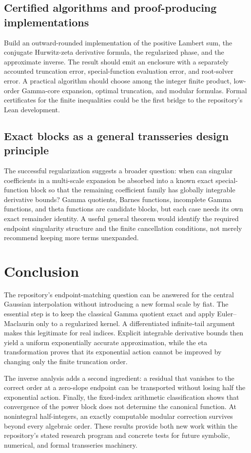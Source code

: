 \documentclass[11pt,a4paper]{article}
\numberwithin{equation}{section}
\theoremstyle{definition}
\begin{document}
\subsection{Certified algorithms and proof-producing implementations}
Build an outward-rounded implementation of the positive Lambert sum, the conjugate Hurwitz-zeta derivative formula, the regularized phase, and the approximate inverse. The result should emit an enclosure with a separately accounted truncation error, special-function evaluation error, and root-solver error. A practical algorithm should choose among the integer finite product, low-order Gamma-core expansion, optimal truncation, and modular formulas. Formal certificates for the finite inequalities could be the first bridge to the repository's Lean development.

\subsection{Exact blocks as a general transseries design principle}
The successful regularization suggests a broader question: when can singular coefficients in a multi-scale expansion be absorbed into a known exact special-function block so that the remaining coefficient family has globally integrable derivative bounds? Gamma quotients, Barnes functions, incomplete Gamma functions, and theta functions are candidate blocks, but each case needs its own exact remainder identity. A useful general theorem would identify the required endpoint singularity structure and the finite cancellation conditions, not merely recommend keeping more terms unexpanded.

\section{Conclusion}

The repository's endpoint-matching question can be answered for the central Gaussian interpolation without introducing a new formal scale by fiat. The essential step is to keep the classical Gamma quotient exact and apply Euler--Maclaurin only to a regularized kernel. A differentiated infinite-tail argument makes this legitimate for real indices. Explicit integrable derivative bounds then yield a uniform exponentially accurate approximation, while the eta transformation proves that its exponential action cannot be improved by changing only the finite truncation order.

The inverse analysis adds a second ingredient: a residual that vanishes to the correct order at a zero-slope endpoint can be transported without losing half the exponential action. Finally, the fixed-index arithmetic classification shows that convergence of the power block does not determine the canonical function. At nonintegral half-integers, an exactly computable modular correction survives beyond every algebraic order. These results provide both new work within the repository's stated research program and concrete tests for future symbolic, numerical, and formal transseries machinery.
\end{document}
